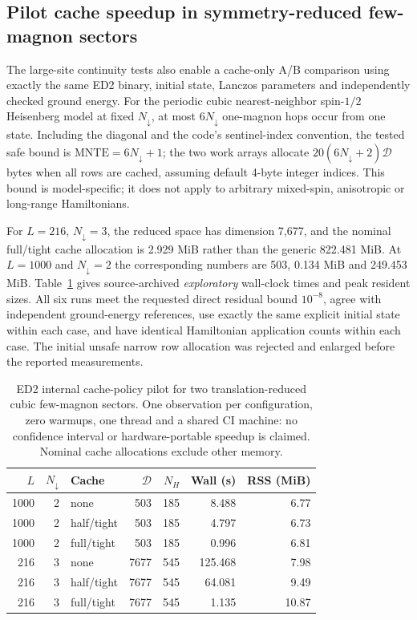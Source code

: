 \documentclass[preprint,12pt,nopreprintline]{elsarticle}
\begin{document}
\subsection{Pilot cache speedup in symmetry-reduced few-magnon sectors}
The large-site continuity tests also enable a cache-only A/B
comparison using exactly the same ED2 binary, initial state,
Lanczos parameters and independently checked ground energy.
For the periodic cubic nearest-neighbor spin-$1/2$
Heisenberg model at fixed $N_\downarrow$, at most
$6N_\downarrow$ one-magnon hops occur from one state.
Including the diagonal and the code's sentinel-index
convention, the tested safe bound is
$\mathrm{MNTE}=6N_\downarrow+1$;
the two work arrays allocate
$20(6N_\downarrow+2)\mathcal D$ bytes when all rows
are cached, assuming default 4-byte integer indices.
This bound is model-specific; it does not apply
to arbitrary mixed-spin, anisotropic or long-range
Hamiltonians.

For $L=216$, $N_\downarrow=3$, the reduced space
has dimension 7,677, and the nominal full/tight
cache allocation is 2.929 MiB rather than the
generic 822.481 MiB. At $L=1000$ and
$N_\downarrow=2$ the corresponding numbers are
503, 0.134 MiB and 249.453 MiB.
Table~\ref{tab:fewmagnon-cache-pilot} gives
source-archived \emph{exploratory} wall-clock
times and peak resident sizes. All six runs meet
the requested direct residual bound $10^{-8}$,
agree with independent ground-energy references,
use exactly the same explicit initial state within
each case, and have identical Hamiltonian application
counts within each case. The initial unsafe narrow
row allocation was rejected and enlarged before
the reported measurements.

\begin{table}[t]
\centering
\caption{ED2 internal cache-policy pilot for two
translation-reduced cubic few-magnon sectors.
One observation per configuration, zero warmups,
one thread and a shared CI machine: no confidence
interval or hardware-portable speedup is claimed.
Nominal cache allocations exclude other memory.}
\label{tab:fewmagnon-cache-pilot}
\small
\begin{tabular}{rrlrrrr}
\toprule
$L$ & $N_\downarrow$ & Cache &
$\mathcal D$ & $N_H$ & Wall (s) & RSS (MiB)\\
\midrule
1000 & 2 & none  & 503 & 185 & 8.488 & 6.77\\
1000 & 2 & half/tight & 503 & 185 & 4.797 & 6.73\\
1000 & 2 & full/tight & 503 & 185 & 0.996 & 6.81\\
216 & 3 & none & 7677 & 545 & 125.468 & 7.98\\
216 & 3 & half/tight & 7677 & 545 & 64.081 & 9.49\\
216 & 3 & full/tight & 7677 & 545 & 1.135 & 10.87\\
\bottomrule
\end{tabular}
\end{table}
\end{document}
